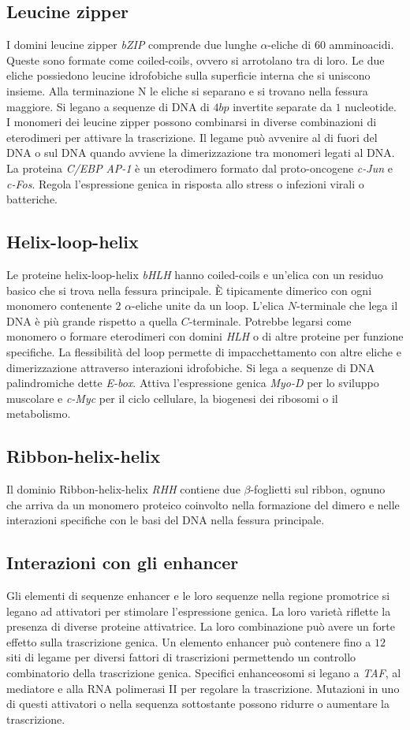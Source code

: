 \subsection{Leucine zipper}
I domini leucine zipper \emph{bZIP} comprende due lunghe $\alpha$-eliche di $60$ amminoacidi. Queste sono formate come coiled-coils, ovvero si arrotolano tra di loro. Le due eliche
possiedono leucine idrofobiche sulla superficie interna che si uniscono insieme. Alla terminazione N le eliche si separano e si trovano nella fessura maggiore. Si legano a sequenze di 
DNA di $4bp$ invertite separate da $1$ nucleotide. I monomeri dei leucine zipper possono combinarsi in diverse combinazioni di eterodimeri per attivare la trascrizione. Il legame pu\`o 
avvenire al di fuori del DNA o sul DNA quando avviene la dimerizzazione tra monomeri legati al DNA. La proteina \emph{C/EBP} \emph{AP-1} \`e un eterodimero formato dal proto-oncogene
\emph{c-Jun} e \emph{c-Fos}. Regola l'espressione genica in risposta allo stress o infezioni virali o batteriche. 
\subsection{Helix-loop-helix}
Le proteine helix-loop-helix \emph{bHLH} hanno coiled-coils e un'elica con un residuo basico che si trova nella fessura principale. \`E tipicamente dimerico con ogni monomero
contenente $2$ $\alpha$-eliche unite da un loop. L'elica $N$-terminale che lega il DNA \`e pi\`u grande rispetto a quella $C$-terminale. Potrebbe legarsi come monomero o formare 
eterodimeri con domini \emph{HLH} o di altre proteine per funzione specifiche. La flessibilit\`a del loop permette di impacchettamento con altre eliche e dimerizzazione attraverso 
interazioni idrofobiche. Si lega a sequenze di DNA palindromiche dette \emph{E-box}. Attiva l'espressione genica \emph{Myo-D} per lo sviluppo muscolare e \emph{c-Myc} per il ciclo
cellulare, la biogenesi dei ribosomi o il metabolismo. 
\subsection{Ribbon-helix-helix}
Il dominio Ribbon-helix-helix \emph{RHH} contiene due $\beta$-foglietti sul ribbon, ognuno che arriva da un monomero proteico coinvolto nella formazione del dimero e nelle interazioni
specifiche con le basi del DNA nella fessura principale. 
\subsection{Interazioni con gli enhancer}
Gli elementi di sequenze enhancer e le loro sequenze nella regione promotrice si legano ad attivatori per stimolare l'espressione genica. La loro variet\`a riflette la presenza di
diverse proteine attivatrice. La loro combinazione pu\`o avere un forte effetto sulla trascrizione genica. Un elemento enhancer pu\`o contenere fino a $12$ siti di legame per 
diversi fattori di trascrizioni permettendo un controllo combinatorio della trascrizione genica. Specifici enhanceosomi si legano a \emph{TAF}, al mediatore e alla RNA polimerasi II per
regolare la trascrizione. Mutazioni in uno di questi attivatori o nella sequenza sottostante possono ridurre o aumentare la trascrizione. 
